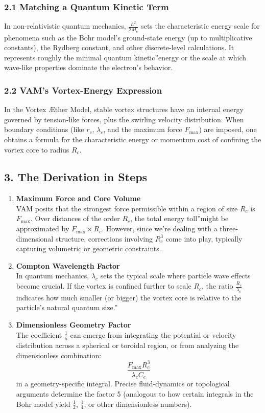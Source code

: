 \subsubsection*{2.1 Matching a Quantum Kinetic Term}
In non-relativistic quantum mechanics, \(\frac{\hbar^2}{2M_e}\) sets the characteristic energy scale for phenomena such as the Bohr model's ground-state energy (up to multiplicative constants), the Rydberg constant, and other discrete-level calculations. It represents roughly the minimal \grqq quantum kinetic\textquotedblright energy or the scale at which wave-like properties dominate the electron's behavior.

\subsubsection*{2.2 VAM's Vortex-Energy Expression}
In the Vortex Æther Model, stable vortex structures have an internal energy governed by tension-like forces, plus the swirling velocity distribution. When boundary conditions (like \(r_c\), \(\lambda_c\), and the maximum force \(F_{\max}\)) are imposed, one obtains a formula for the characteristic energy or momentum cost of confining the vortex core to radius \(R_c\).

\subsection*{3. The Derivation in Steps}

\begin{enumerate}
    \item \textbf{Maximum Force and Core Volume} \\
    VAM posits that the strongest force permissible within a region of size \(R_c\) is \(F_{\max}\). Over distances of the order \(R_c\), the total \grqq energy toll\textquotedblright might be approximated by \(F_{\max} \times R_c\). However, since we're dealing with a three-dimensional structure, corrections involving \(R_c^3\) come into play, typically capturing volumetric or geometric constraints.
    \item \textbf{Compton Wavelength Factor} \\
    In quantum mechanics, \(\lambda_c\) sets the typical scale where particle wave effects become crucial. If the vortex is confined further to scale \(R_c\), the ratio \(\tfrac{R_c}{\lambda_c}\) indicates how much smaller (or bigger) the vortex core is relative to the particle's natural quantum \grqq size.\textquotedblright
    \item \textbf{Dimensionless Geometry Factor} \\
    The coefficient \(\frac{1}{5}\) can emerge from integrating the potential or velocity distribution across a spherical or toroidal region, or from analyzing the dimensionless combination:
    \[
        \frac{F_{\max} R_c^3}{\lambda_c C_e}
    \]
    in a geometry-specific integral. Precise fluid-dynamics or topological arguments determine the factor 5 (analogous to how certain integrals in the Bohr model yield \(\tfrac12\), \(\tfrac14\), or other dimensionless numbers).
\end{enumerate}

